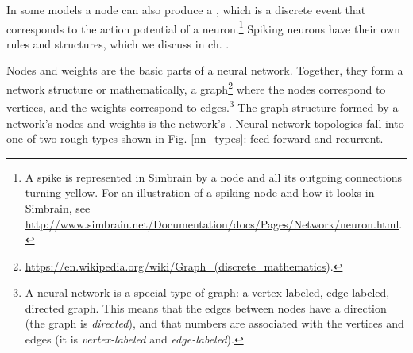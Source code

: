 In some models a node can also produce a , which is a discrete event that corresponds to the action potential of a neuron.\footnote{A spike is represented in Simbrain by a node and all its outgoing connections turning yellow. For an illustration of a spiking node and how it looks in Simbrain, see \url{http://www.simbrain.net/Documentation/docs/Pages/Network/neuron.html}.}  Spiking neurons have their own rules and structures, which we discuss in ch. .

Nodes and weights are the basic parts of a neural network. Together, they form a network structure or mathematically, a graph\footnote{\url{https://en.wikipedia.org/wiki/Graph_(discrete_mathematics)}.} where the nodes correspond to vertices, and the weights correspond to edges.\footnote{A neural network is a special type of graph: a vertex-labeled, edge-labeled, directed graph. This means that the edges between nodes have a direction (the graph is \emph{directed}), and that numbers are associated with the vertices and edges (it is \emph{vertex-labeled} and \emph{edge-labeled}).}  The graph-structure formed by a network's nodes and weights is the network's . Neural network topologies fall into one of two rough types shown in Fig. \ref{nn_types}: feed-forward and recurrent. 

